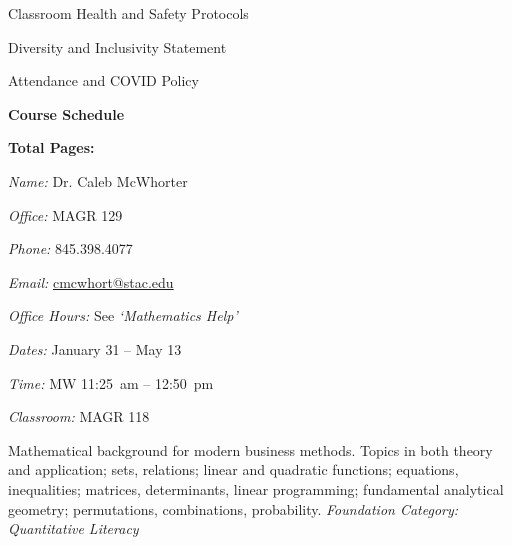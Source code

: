 \documentclass[11pt,letterpaper]{article}
\makeatletter
\newcommand{\classdates}{January 31 -- May 13}
\newcommand{\classtimes}{MW 11:25~am -- 12:50~pm}
\newcommand{\classroom}{MAGR 118}
\newcommand{\instructor}{Dr. Caleb McWhorter}
\newcommand{\office}{MAGR 129}
\newcommand{\phone}{845.398.4077}
\newcommand{\email}{cmcwhort@stac.edu}
\newcommand{\officehours}{See \textit{`Mathematics Help'}}
\makeatother
\begin{document}
\begin{minipage}[t]{0.45\textwidth}
\hspace{0.3cm} Classroom Health and Safety Protocols \dotfill \pageref{college_healthsafety} \par
\hspace{0.3cm} Diversity and Inclusivity Statement \dotfill \pageref{college_inclusive} \par
\hspace{0.3cm} Attendance and COVID Policy \dotfill \pageref{college_attnd} \par
{\bfseries\color{stacred} Course Schedule} \dotfill \pageref{schd} \par
\hfill {\bfseries\color{stacred} Total Pages:} \pageref*{LastPage}
\end{minipage}
\sectionbreak









\textit{Name:} \instructor \par
\textit{Office:} \office \par
\textit{Phone:} \phone \par
\textit{Email:} \href{mailto:\email}{\email} \par
\textit{Office Hours:} \officehours 
\sectionbreak



\textit{Dates:} \classdates \par
\textit{Time:} \classtimes \par
\textit{Classroom:} \classroom 
\sectionbreak



Mathematical background for modern business methods. Topics in both theory and application; sets, relations; linear and quadratic functions; equations, inequalities; matrices, determinants, linear programming; fundamental analytical geometry; permutations, combinations, probability. {\itshape Foundation Category: Quantitative Literacy}
\sectionbreak
\end{document}
